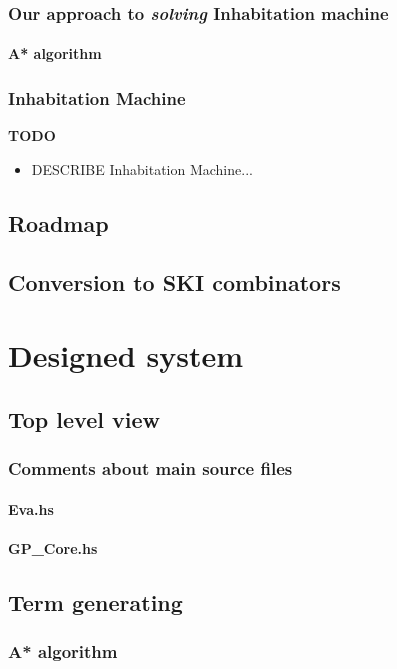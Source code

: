 \documentclass[12pt,a4paper]{report}
\begin{document}
\subsection{Our approach to \textit{solving} Inhabitation machine}

\subsubsection{A* algorithm}


\subsection{Inhabitation Machine}
\textbf{TODO} 
\begin{itemize}
\item DESCRIBE Inhabitation Machine...
\end{itemize}


\section{Roadmap}
	\section{Conversion to SKI combinators}

\chapter{ Designed system }	
	\section{Top level view}
		\subsection{Comments about main source files}
			\subsubsection{ Eva.hs }
			\subsubsection{ GP\_{}Core.hs }
	\section{Term generating}
		\subsection{A* algorithm}
\end{document}
